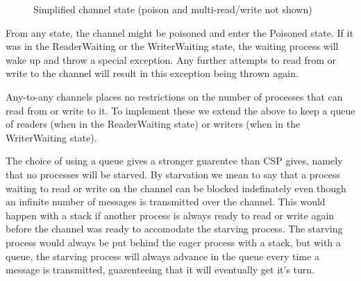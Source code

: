 \documentclass[a4paper,12pt]{article}
\begin{document}
\begin{figure}[h]
\centering
\caption{Simplified channel state (poison and multi-read/write not shown)}
\label{channel-state}
\end{figure}

From any state, the channel might be poisoned and enter the Poisoned state. If it was in the
ReaderWaiting or the WriterWaiting state, the waiting process will wake up and throw a special
exception. Any further attempts to read from or write to the channel will result in this 
exception being thrown again.

Any-to-any channels places no restrictions on the number of processes that can
read from or write to it. To implement these we extend the above to keep a queue
of readers (when in the ReaderWaiting state) or writers (when in the
WriterWaiting state).

The choice of using a queue gives a stronger guarentee than CSP gives, namely that no processes
will be starved. By starvation we mean to say that a process waiting to read or write on the
channel can be blocked indefinately even though an infinite number of messages is transmitted
over the channel. This would happen with a stack if another process is always ready to read or 
write again before the channel was ready to accomodate the starving process. The starving process
would always be put behind the eager process with a stack, but with a queue, the starving process
will always advance in the queue every time a message is transmitted, guarenteeing that it will
eventually get it's turn.
\end{document}
